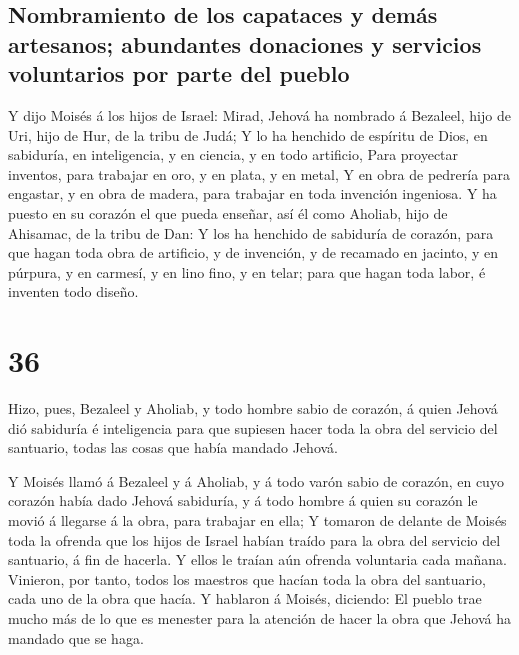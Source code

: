 \hypertarget{nombramiento-de-los-capataces-y-demuxe1s-artesanos-abundantes-donaciones-y-servicios-voluntarios-por-parte-del-pueblo}{%
\subsection{Nombramiento de los capataces y demás artesanos; abundantes
donaciones y servicios voluntarios por parte del
pueblo}\label{nombramiento-de-los-capataces-y-demuxe1s-artesanos-abundantes-donaciones-y-servicios-voluntarios-por-parte-del-pueblo}}

 Y dijo Moisés á los hijos de Israel: Mirad, Jehová ha
nombrado á Bezaleel, hijo de Uri, hijo de Hur, de la tribu de Judá;
 Y lo ha henchido de espíritu de Dios, en sabiduría, en
inteligencia, y en ciencia, y en todo artificio,  Para
proyectar inventos, para trabajar en oro, y en plata, y en metal,
 Y en obra de pedrería para engastar, y en obra de
madera, para trabajar en toda invención ingeniosa.  Y ha
puesto en su corazón el que pueda enseñar, así él como Aholiab, hijo de
Ahisamac, de la tribu de Dan:  Y los ha henchido de
sabiduría de corazón, para que hagan toda obra de artificio, y de
invención, y de recamado en jacinto, y en púrpura, y en carmesí, y en
lino fino, y en telar; para que hagan toda labor, é inventen todo
diseño.

\hypertarget{section-35}{%
\section{36}\label{section-35}}

 Hizo, pues, Bezaleel y Aholiab, y todo hombre sabio de
corazón, á quien Jehová dió sabiduría é inteligencia para que supiesen
hacer toda la obra del servicio del santuario, todas las cosas que había
mandado Jehová.

 Y Moisés llamó á Bezaleel y á Aholiab, y á todo varón
sabio de corazón, en cuyo corazón había dado Jehová sabiduría, y á todo
hombre á quien su corazón le movió á llegarse á la obra, para trabajar
en ella;  Y tomaron de delante de Moisés toda la ofrenda
que los hijos de Israel habían traído para la obra del servicio del
santuario, á fin de hacerla. Y ellos le traían aún ofrenda voluntaria
cada mañana.  Vinieron, por tanto, todos los maestros que
hacían toda la obra del santuario, cada uno de la obra que hacía.
 Y hablaron á Moisés, diciendo: El pueblo trae mucho más
de lo que es menester para la atención de hacer la obra que Jehová ha
mandado que se haga.

